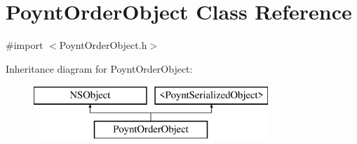 \hypertarget{interface_poynt_order_object}{}\section{Poynt\+Order\+Object Class Reference}
\label{interface_poynt_order_object}


{\ttfamily \#import $<$Poynt\+Order\+Object.\+h$>$}

Inheritance diagram for Poynt\+Order\+Object\+:\begin{figure}[H]
\begin{center}
\leavevmode
\includegraphics[height=2.000000cm]{interface_poynt_order_object}
\end{center}
\end{figure}
